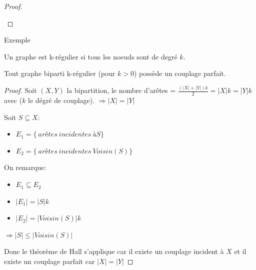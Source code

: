 \begin{mytheo} 
\begin{proof}
\begin{center}
\end{center}

  \end{proof}
\end{mytheo}
\begin{myexem}
  Exemple \addTODO
\end{myexem}

\begin{myrem}
  Un graphe est k-régulier si tous les noeuds sont de degré $k$.
\end{myrem}

\begin{mycorr}
  Tout graphe biparti k-régulier (pour $k > 0$) possède un couplage parfait.
  \begin{proof}
  Soit $(X,Y)$ la bipartition, le nombre d'arêtes = $\frac{(|X| + |Y|) k}{2} = |X| k = |Y| k$ avec ($k$ le dégré de couplage). $\Rightarrow |X| = |Y|$
  
  Soit $S \subseteq X$:
  \begin{itemize}
   \item $E_{1} = \lbrace \ arêtes\ incidentes\ à S \rbrace$
   \item $E_{2} = \lbrace \ arêtes\ incidentes\ Voisin(S) \rbrace$
   \end{itemize} 
   
  On remarque:
  \begin{itemize}
  \item $E_{1} \subseteq E_{2}$ 
  \item $|E_{1}| = |S| k$
  \item $|E_{2}| = |Voisin(S)| k$
  \end{itemize}
  $\Rightarrow |S| \leq |Voisin(S)|$
  
  Donc le théorème de Hall s'applique car il existe un couplage incident à $X$ et il existe un couplage parfait car $|X|=|Y|$
  \end{proof}
\end{mycorr}

